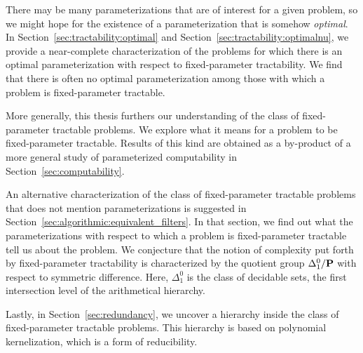 There may be many parameterizations that are of interest for a given problem, so we might hope for the existence of a parameterization that is somehow \emph{optimal}.
In Section~\ref{sec:tractability:optimal} and Section~\ref{sec:tractability:optimalnu}, we provide a near-complete characterization of the problems for which there is an optimal parameterization with respect to fixed-parameter tractability.
We find that there is often no optimal parameterization among those with which a problem is fixed-parameter tractable.

More generally, this thesis furthers our understanding of the class of fixed-parameter tractable problems.
We explore what it means for a problem to be fixed-parameter tractable.
Results of this kind are obtained as a by-product of a more general study of parameterized computability in Section~\ref{sec:computability}.

An alternative characterization of the class of fixed-parameter tractable problems that does not mention parameterizations is suggested in Section~\ref{sec:algorithmic:equivalent_filters}.
In that section, we find out what the parameterizations with respect to which a problem is fixed-parameter tractable tell us about the problem.
We conjecture that the notion of complexity put forth by fixed-parameter tractability is characterized by the quotient group $\Delta^0_1 / \textnormal{\textbf{P}}$ with respect to symmetric difference.
Here, $\Delta^0_1$ is the class of decidable sets, the first intersection level of the arithmetical hierarchy.

Lastly, in Section~\ref{sec:redundancy}, we uncover a hierarchy inside the class of fixed-parameter tractable problems.
This hierarchy is based on polynomial kernelization, which is a form of reducibility.
